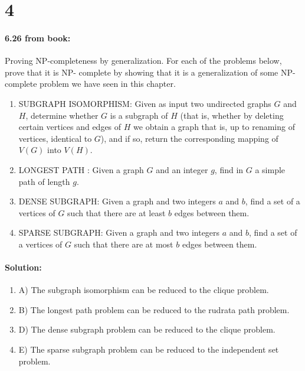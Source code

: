 \documentclass[12pt]{article}
\begin{document}
\section*{4}
\paragraph{6.26 from book:}
Proving NP-completeness by generalization. For each of the problems below, prove that it is NP-
complete by showing that it is a generalization of some NP-complete problem we have seen in
this chapter.
\begin{enumerate}
\item  SUBGRAPH ISOMORPHISM: Given as input two undirected graphs $G$
        and $H$, determine whether $G$ is a subgraph of $H$ (that is, whether by
        deleting certain vertices and edges of $H$ we obtain a graph that is, up
        to renaming of vertices, identical to $G$), and if so, return the
        corresponding mapping of $V(G)$ into $V(H)$.

\item LONGEST PATH :
        Given a graph $G$ and an integer $g$, find in $G$ a simple path
        of length $g$.

\item  DENSE SUBGRAPH: Given a graph and two integers $a$ and $b$, find
        a set of a vertices of $G$ such that there are at least $b$ edges
        between them.

\item SPARSE SUBGRAPH: Given a graph and two integers $a$ and $b$, find
        a set of a vertices of $G$ such that there are at most $b$ edges between
        them.
\end{enumerate}

\paragraph{Solution:}
\begin{enumerate}

\item A) The subgraph isomorphism can be reduced to the clique problem.

\item B) The longest path problem can be reduced to the rudrata path problem.

\item D) The dense subgraph problem can be reduced to the clique problem.

\item E) The sparse subgraph problem can be reduced to the independent set problem.

\end{enumerate}
\end{document}
